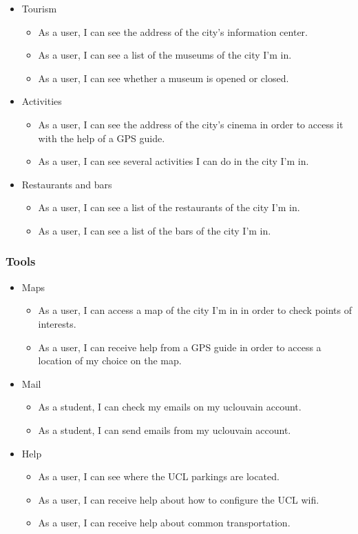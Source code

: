 \documentclass{eplmastersthesis}
\begin{document}
\begin{itemize}

\item Tourism
\begin{itemize} 
\item As a user, I can see the address of the city's information center.
\item As a user, I can see a list of the museums of the city I'm in.
\item As a user, I can see whether a museum is opened or closed.
\end{itemize}

\item Activities
\begin{itemize} 
\item As a user, I can see the address of the city's cinema in order to access it with the help of a GPS guide.
\item As a user, I can see several activities I can do in the city I'm in.

\end{itemize}

\item Restaurants and bars
\begin{itemize} 
\item As a user, I can see a list of the restaurants of the city I'm in.
\item As a user, I can see a list of the bars of the city I'm in.
\end{itemize}

\end{itemize}

\subsubsection{Tools}

\begin{itemize}
\item Maps
\begin{itemize}
\item As a user, I can access a map of the city I'm in in order to check points of interests.
\item As a user, I can receive help from a GPS guide in order to access a location of my choice on the map.
\end{itemize}
\item Mail
\begin{itemize}
\item As a student, I can check my emails on my uclouvain account.
\item As a student, I can send emails from my uclouvain account.
\end{itemize}
\item{Help}
\begin{itemize}
\item As a user, I can see where the UCL parkings are located.
\item As a user, I can receive help about how to configure the UCL wifi.
\item As a user, I can receive help about common transportation.
\end{itemize}
\end{itemize}
\end{document}
